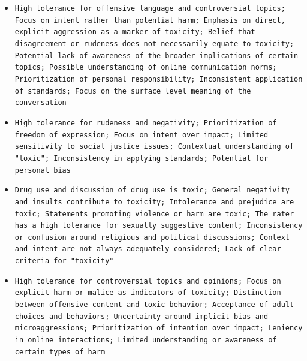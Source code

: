 \documentclass[11pt]{article}
\begin{document}
\begin{itemize}
\item \texttt{High tolerance for offensive language and controversial topics; Focus on intent rather than potential harm; Emphasis on direct, explicit aggression as a marker of toxicity; Belief that disagreement or rudeness does not necessarily equate to toxicity; Potential lack of awareness of the broader implications of certain topics; Possible understanding of online communication norms; Prioritization of personal responsibility; Inconsistent application of standards; Focus on the surface level meaning of the conversation}
\item \texttt{High tolerance for rudeness and negativity; Prioritization of freedom of expression; Focus on intent over impact; Limited sensitivity to social justice issues; Contextual understanding of "toxic"; Inconsistency in applying standards; Potential for personal bias}
\item \texttt{Drug use and discussion of drug use is toxic; General negativity and insults contribute to toxicity; Intolerance and prejudice are toxic; Statements promoting violence or harm are toxic; The rater has a high tolerance for sexually suggestive content; Inconsistency or confusion around religious and political discussions; Context and intent are not always adequately considered; Lack of clear criteria for "toxicity"}
\item \texttt{High tolerance for controversial topics and opinions; Focus on explicit harm or malice as indicators of toxicity; Distinction between offensive content and toxic behavior; Acceptance of adult choices and behaviors; Uncertainty around implicit bias and microaggressions; Prioritization of intention over impact; Leniency in online interactions; Limited understanding or awareness of certain types of harm}
\end{itemize}
\end{document}
